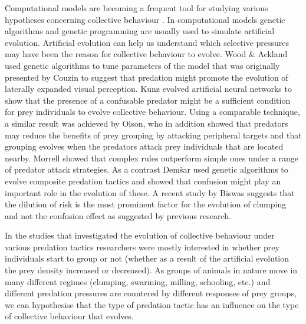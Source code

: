 Computational models are becoming a frequent tool for studying various hypotheses concerning collective behaviour \cite{lebarbajec2009organized,sumpter2006principles,vicsek2012collective}. In computational models genetic algorithms \cite{holland1992adaptation} and genetic programming \cite{koza1992genetic} are usually used to simulate artificial evolution. Artificial evolution can help us understand which selective pressures may have been the reason for collective behaviour to evolve. Wood \& Ackland \cite{wood2007evolving} used genetic algorithms to tune parameters of the model that was originally presented by Couzin\etal \cite{couzin2002collective} to suggest that predation might promote the evolution of laterally expanded visual perception. Kunz\etal \cite{kunz2006prey} evolved artificial neural networks to show that the presence of a confusable predator might be a sufficient condition for prey individuals to evolve collective behaviour. Using a comparable technique, a similar result was achieved by Olson\etal \cite{olson2013predator,olson2016evolution}, who in addition showed that predators may reduce the benefits of prey grouping by attacking peripheral targets and that grouping evolves when the predators attack prey individuals that are located nearby. Morrell\etal \cite{morrell2015consequences} showed that complex rules outperform simple ones under a range of predator attack strategies. As a contrast Demšar\etal \cite{demsar2015simulating} used genetic algorithms to evolve composite predation tactics and showed that confusion might play an important role in the evolution of these. A recent study by Biswas\etal \cite{biswas2014causes} suggests that the dilution of risk is the most prominent factor for the evolution of clumping and not the confusion effect as suggested by previous research. 

In the studies that investigated the evolution of collective behaviour under various predation tactics \cite{biswas2014causes,morrell2015consequences,olson2013predator,olson2016evolution} researchers were mostly interested in whether prey individuals start to group or not (\ie whether as a result of the artificial evolution the prey density increased or decreased). As groups of animals in nature move in many different regimes (clumping, swarming, milling, schooling, etc.) \cite{krause2002living,suzuki1973movement} and different predation pressures are countered by different responses of prey groups, we can hypothesise that the type of predation tactic has an influence on the type of collective behaviour that evolves.

